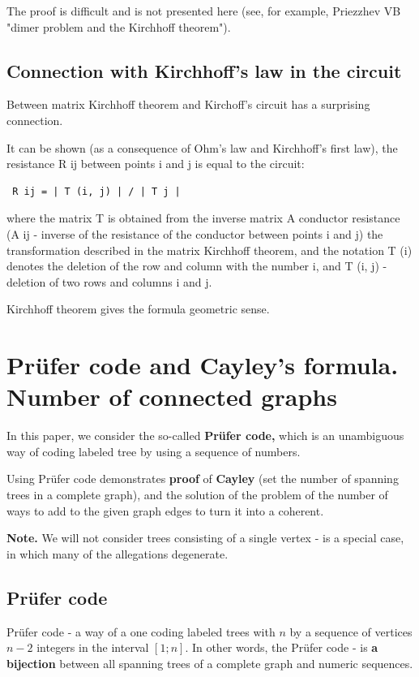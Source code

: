 The proof is difficult and is not presented here (see, for example, Priezzhev VB "dimer problem and the Kirchhoff theorem").

\subsection{ Connection with Kirchhoff's law in the circuit }
Between matrix Kirchhoff theorem and Kirchoff's circuit has a surprising connection.

It can be shown (as a consequence of Ohm's law and Kirchhoff's first law), the resistance R ij between points i and j is equal to the circuit:

\begin{verbatim}
 R ij = | T (i, j) | / | T j | 
\end{verbatim}
where the matrix T is obtained from the inverse matrix A conductor resistance (A ij - inverse of the resistance of the conductor between points i and j) the transformation described in the matrix Kirchhoff theorem, and the notation T (i) denotes the deletion of the row and column with the number i, and T (i, j) - deletion of two rows and columns i and j.

Kirchhoff theorem gives the formula geometric sense.

\section{ Prüfer code and Cayley's formula. Number of connected graphs }
In this paper, we consider the so-called \textbf{Prüfer code,} which is an unambiguous way of coding labeled tree by using a sequence of numbers.

Using Prüfer code demonstrates \textbf{proof} of \textbf{Cayley} (set the number of spanning trees in a complete graph), and the solution of the problem of the number of ways to add to the given graph edges to turn it into a coherent.

\textbf{Note.} We will not consider trees consisting of a single vertex - is a special case, in which many of the allegations degenerate.

\subsection{ Prüfer code }

Prüfer code - a way of a one coding labeled trees with $n$ by a sequence of vertices $n-2$ integers in the interval $[1; n]$. In other words, the Prüfer code - is \textbf{a bijection} between all spanning trees of a complete graph and numeric sequences.

